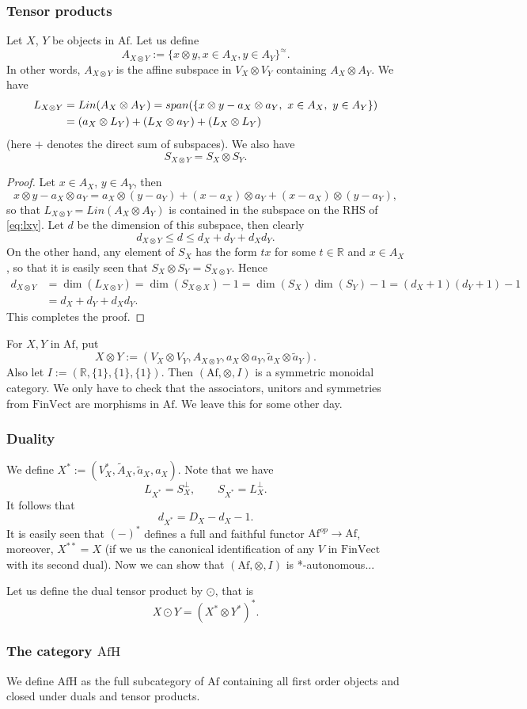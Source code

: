 \documentclass[12pt]{article}
\theoremstyle{definition}
\theoremstyle{remark}
\def \Afh{\mathrm{AfH}}
\def \Af{\mathrm{Af}}
\def \FV{\mathrm{FinVect}}
\begin{document}
\subsubsection{Tensor products}

Let $X$, $Y$ be objects in $\Af$. Let us define
\[
A_{X\otimes Y}:=\{x\otimes y, x\in A_X, y\in A_Y\}^{\approx}.
\]
In other words, $A_{X\otimes Y}$ is the affine subspace in $V_X\otimes V_Y$ containing
$A_X\otimes A_Y$. We have
\begin{align}
L_{X\otimes Y}&=Lin(A_X\otimes A_Y)=span(\{x\otimes y-a_X\otimes a_Y,\ x\in A_X,\ y\in
A_Y\})\notag\\
&= (a_X\otimes L_Y)+ (L_X\otimes a_Y)+ (L_X\otimes L_Y)\label{eq:lxy}
\end{align}
(here $+$ denotes the direct sum of subspaces). We also have
\[
S_{X\otimes Y}=S_X\otimes S_Y.
\]

\begin{proof} Let $x\in A_X$, $y\in A_Y$, then
\[
x\otimes y-a_X\otimes a_Y=a_X\otimes (y-a_Y)+(x-a_X)\otimes a_Y+(x-a_X)\otimes (y-a_Y),
\]
so that $L_{X\otimes Y}=Lin(A_X\otimes A_Y)$ is contained in the subspace on the RHS of \eqref{eq:lxy}.
Let $d$ be the dimension of this subspace, then clearly
\[
d_{X\otimes Y}\le d\le d_X+d_Y+d_Xd_Y.
\]
On the other hand, any element of $S_X$ has the form $tx$ for some $t\in \mathbb R$ and
$x\in A_X$, so that it is easily seen that $S_X\otimes S_Y=S_{X\otimes Y}$. 
Hence 
\begin{align*}
d_{X\otimes Y}&=\dim(L_{X\otimes Y})=\dim(S_{X\otimes
X})-1=\dim(S_X)\dim(S_Y)-1=(d_X+1)(d_Y+1)-1\\
&=d_X+d_Y+d_Xd_Y.
\end{align*}
This completes the proof.

\end{proof}

For $X,Y$ in $\Af$, put 
\[
X\otimes Y:=(V_X\otimes V_Y,A_{X\otimes Y},a_X\otimes a_Y, \tilde
a_X\otimes \tilde a_Y).
\]
Also let $I:=(\mathbb R, \{1\},\{1\},\{1\})$. Then $(\Af,\otimes, I)$ is a symmetric
monoidal category. We only have to check that the associators, unitors and symmetries from
$\FV$ are morphisms in $\Af$. We leave this for some other day.

\subsubsection{Duality}

We define $X^*:=(V_X^*,\tilde A_X,\tilde a_X,a_X)$. Note that we have
\[
L_{X^*}=S_X^\perp,\qquad S_{X^*}=L_X^\perp.
\]
It follows that
\[
d_{X^*}=D_X-d_X-1.
\]
It is easily seen  that $(-)^*$ defines a full and faithful functor $\Af^{op}\to \Af$,
moreover, $X^{**}=X$ (if we us the canonical identification of  any $V$ in $\FV$ with its second dual). 
Now we can show that $(\Af,\otimes, I)$ is *-autonomous...


Let us define the dual tensor product by $\odot$, that is
\[
X\odot Y=(X^*\otimes Y^*)^*.
\]


\subsubsection{The category $\Afh$} 

We define $\Afh$ as the full subcategory of $\Af$ containing all first order objects and
closed under duals and tensor products. 
\end{document}
